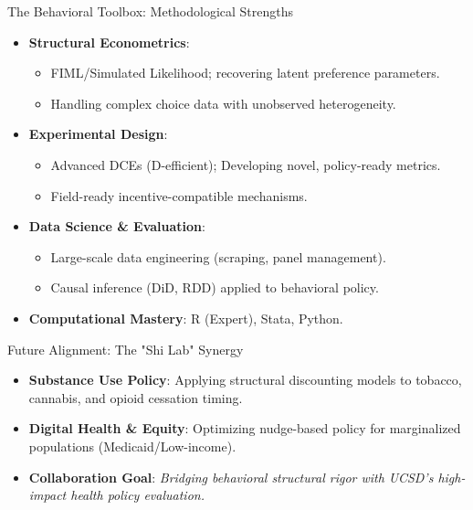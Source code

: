 \documentclass[10pt]{beamer}
\begin{document}
\begin{frame}{The Behavioral Toolbox: Methodological Strengths}
    \begin{itemize}
        \item \textbf{Structural Econometrics}: 
            \begin{itemize}
                \item FIML/Simulated Likelihood; recovering latent preference parameters.
                \item Handling complex choice data with unobserved heterogeneity.
            \end{itemize}
        \item \textbf{Experimental Design}: 
            \begin{itemize}
                \item Advanced DCEs (D-efficient); Developing novel, policy-ready metrics.
                \item Field-ready incentive-compatible mechanisms.
            \end{itemize}
        \item \textbf{Data Science \& Evaluation}:
            \begin{itemize}
                \item \alert{Large-scale data engineering} (scraping, panel management).
                \item \alert{Causal inference} (DiD, RDD) applied to behavioral policy.
            \end{itemize}
        \item \textbf{Computational Mastery}: R (Expert), Stata, Python.
    \end{itemize}
\end{frame}

\begin{frame}{Future Alignment: The "Shi Lab" Synergy}
    \begin{itemize}
        \item \textbf{Substance Use Policy}: Applying structural discounting models to tobacco, cannabis, and opioid cessation timing.
        \item \textbf{Digital Health \& Equity}: Optimizing nudge-based policy for marginalized populations (Medicaid/Low-income).
        \item \textbf{Collaboration Goal}: 
            \textit{Bridging behavioral structural rigor with UCSD's high-impact health policy evaluation.}
    \end{itemize}
\end{frame}
\end{document}
